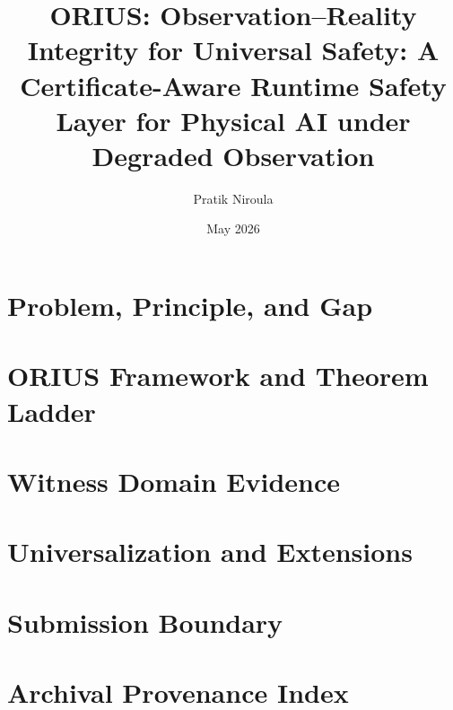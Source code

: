 \documentclass[12pt,oneside]{book}
\title{ORIUS: Observation--Reality Integrity for Universal Safety: A Certificate-Aware Runtime Safety Layer for Physical AI under Degraded Observation}
\author{Pratik Niroula}
\date{May 2026}
\begin{document}
\hypersetup{pageanchor=false}
\frontmatter

\cleardoublepage

\cleardoublepage

\tableofcontents
\listoftables
\listoffigures

\hypersetup{pageanchor=true}
\mainmatter

\part{Problem, Principle, and Gap}




\part{ORIUS Framework and Theorem Ladder}




\part{Witness Domain Evidence}



\part{Universalization and Extensions}






\part{Submission Boundary}


\part{Archival Provenance Index}
\end{document}
